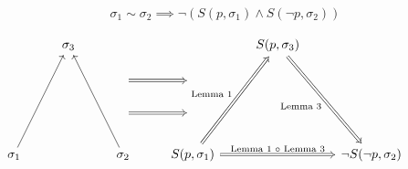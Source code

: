 \documentclass{article}
\begin{document}
\begin{thm}
\begin{description}
$$
\sigma_1 \sim \sigma_2 \implies \neg(S(p,\sigma_1) \land S(\neg{p},\sigma_2))
$$
\end{description}
\end{thm}
\begin{equation*}
\begin{tikzcd}
{}
  &
\sigma_3
  &
{}
  &
{}
  &
S(p,\sigma_3)
  &
{}
  &
{}
  \\ 
{}
  &
{}
  &
{}
  \arrow[r,Rightarrow,""]
  &
{}
  &
{}
  &
{}
  &
{}
  \\
{}
  &
{}
  &
{}
  \arrow[r,Rightarrow,""]
  &
{}
  &
{}
  &
{}
  &
{}
  \\
\sigma_1
  \arrow[uuur,""]
  &
{}
  &
\sigma_2
  \arrow[uuul,""]
{}
  &
S(p,\sigma_1)
  \arrow[uuur,Rightarrow,"\text{Lemma 1}"]
  \arrow[rr,Rightarrow,"\text{Lemma 1 $\circ$ Lemma 3}"]
  &
{}
  &
\neg{S(\neg{p},\sigma_2)}
  \arrow[uuul,Leftarrow,"\text{Lemma 3}"] 
\end{tikzcd}
\end{equation*}
\end{document}
